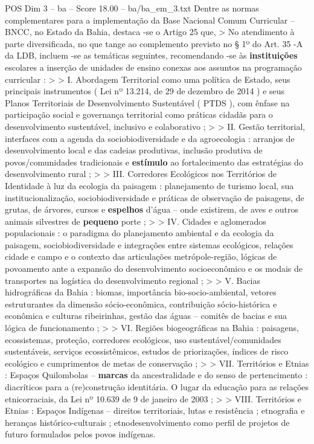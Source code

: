 \begin{textsample}{POS Dim 3 – ba – Score 18.00 – ba/ba\_em\_3.txt}
Dentre as normas complementares para a implementação da Base Nacional Comum Curricular – BNCC, no Estado da Bahia, destaca -se o Artigo 25 que, > No atendimento à parte diversificada, no que tange ao complemento previsto no § 1º do Art. 35 -A da LDB, incluem -se as temáticas seguintes, recomendando -se às \textbf{instituições} escolares a inserção de unidades de ensino conexas aos assuntos na programação curricular : > > I.
Abordagem Territorial como uma política de Estado, seus principais instrumentos ( Lei nº 13.214, de 29 de dezembro de 2014 ) e seus Planos Territoriais de Desenvolvimento Sustentável ( PTDS ), com ênfase na participação social e governança territorial como práticas cidadãs para o desenvolvimento sustentável, inclusivo e colaborativo ; > > II.
Gestão territorial, interfaces com a agenda da sociobiodiversidade e da agroecologia : arranjos de desenvolvimento local e das cadeias produtivas, inclusão produtiva de povos/comunidades tradicionais e \textbf{estímulo} ao fortalecimento das estratégias do desenvolvimento rural ; > > III.
Corredores Ecológicos nos Territórios de Identidade à luz da ecologia da paisagem : planejamento de turismo local, sua institucionalização, sociobiodiversidade e práticas de observação de paisagens, de grutas, de árvores, cursos e \textbf{espelhos} d’água – onde existirem, de aves e outros animais silvestres de \textbf{pequeno} porte ; > > IV.
Cidades e aglomerados populacionais : o paradigma do planejamento ambiental e da ecologia da paisagem, sociobiodiversidade e integrações entre sistemas ecológicos, relações cidade e campo e o contexto das articulações metrópole-região, lógicas de povoamento ante a expansão do desenvolvimento socioeconômico e os modais de transportes na logística do desenvolvimento regional ; > > V.
Bacias hidrográficas da Bahia : biomas, importância bio-socio-ambiental, vetores estruturantes da dimensão sócio-econômica, contribuição sócio-histórica e econômica e culturas ribeirinhas, gestão das águas – comitês de bacias e sua lógica de funcionamento ; > > VI.
Regiões biogeográficas na Bahia : paisagens, ecossistemas, proteção, corredores ecológicos, uso sustentável/comunidades sustentáveis, serviços ecossistêmicos, estudos de priorizações, índices de risco ecológico e cumprimentos de metas de conservação ; > > VII.
Territórios e Etnias : Espaços Quilombolas – \textbf{marcas} da ancestralidade e do senso de pertencimento : diacríticos para a (re)construção identitária.
O lugar da educação para as relações etnicorraciais, da Lei nº 10.639 de 9 de janeiro de 2003 ; > > VIII.
Territórios e Etnias : Espaços Indígenas – direitos territoriais, lutas e resistência ; etnografia e heranças histórico-culturais ; etnodesenvolvimento como perfil de projetos de futuro formulados pelos povos indígenas.

\end{textsample}
